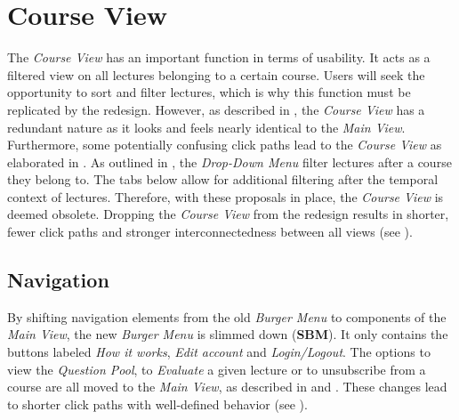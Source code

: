 \section{Course View}
The \emph{Course View} has an important function in terms of usability. It acts as a filtered view on all lectures belonging to a certain course. Users will seek the opportunity to sort and filter lectures, which is why this function must be replicated by the redesign. However, as described in , the \emph{Course View} has a redundant nature as it looks and feels nearly identical to the \emph{Main View}.
Furthermore, some potentially confusing click paths lead to the \emph{Course View} as elaborated in .
As outlined in , the \emph{Drop-Down Menu} filter lectures after a course they belong to. The tabs below allow for additional filtering after the temporal context of lectures. Therefore, with these proposals in place, the \emph{Course View} is deemed obsolete. Dropping the \emph{Course View} from the redesign results in shorter, fewer click paths and stronger interconnectedness between all views (see ).

\subsection{Navigation}
By shifting navigation elements from the old \emph{Burger Menu} to components of the \emph{Main View}, the new \emph{Burger Menu} is slimmed down (\textbf{SBM}).
It only contains the buttons labeled \emph{How it works}, \emph{Edit account} and \emph{Login/Logout}. The options to view the \emph{Question Pool}, to \emph{Evaluate} a given lecture or to unsubscribe from a course are all moved to the \emph{Main View}, as described in   and .
These changes lead to shorter click paths with well-defined behavior (see \todogrf).

